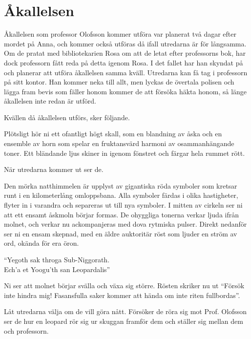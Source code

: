 \section{Åkallelsen}
\label{sek:Akallelsen}
Åkallelsen som professor Olofsson kommer utföra var planerat två dagar efter mordet på Anna, och kommer också utföras då ifall utredarna är för långsamma. Om de pratat med bibliotekarien Rosa om att de letat efter professorns bok, har dock professorn fått reda på detta igenom Rosa. I det fallet har han skyndat på och planerar att utföra åkallelsen samma kväll. Utredarna kan få tag i professorn på sitt kontor. Han kommer neka till allt, men lyckas de övertala polisen och lägga fram bevis som fäller honom kommer de att försöka häkta honom, så länge åkallelsen inte redan är utförd.

Kvällen då åkallelsen utförs, sker följande.
%
\begin{displayquote}
	Plötsligt hör ni ett ofantligt högt skall, som en blandning av åska och en ensemble av horn som spelar en fruktansvärd harmoni av osammanhängande toner. Ett bländande ljus skiner in igenom fönstret och färgar hela rummet rött.
\end{displayquote}
%
När utredarna kommer ut ser de.

\begin{displayquote}
	Den mörka natthimmelen är upplyst av gigantiska röda symboler som kretsar runt i en kilometerlång omloppsbana. Alla symboler färdas i olika hastigheter, flyter in i varandra och separeras ut till nya symboler. I mitten av cirkeln ser ni att ett ensamt åskmoln börjar formas. De ohyggliga tonerna verkar ljuda ifrån molnet, och verkar nu ackompanjeras med dova rytmiska pulser. Direkt nedanför ser ni en ensam skepnad, med en äldre auktoritär röst som ljuder en ström av ord, okända för era öron.
	\begin{center}
		``Yegoth sak throga Sub-Niggorath. \\
		Ech'a et Yoogu'th san Leopardalis''
	\end{center}
	Ni ser att molnet börjar svälla och växa sig större. Rösten skriker nu ut ``Försök inte hindra mig! Fasansfulla saker kommer att hända om inte riten fullbordas''.
\end{displayquote}
%
Låt utredarna välja om de vill göra nått. Försöker de röra sig mot Prof. Olofsson ser de hur en leopard \sectiondescribe{\ref{var:Leopard}} rör sig ur skuggan framför dem och ställer sig mellan dem och professorn.


